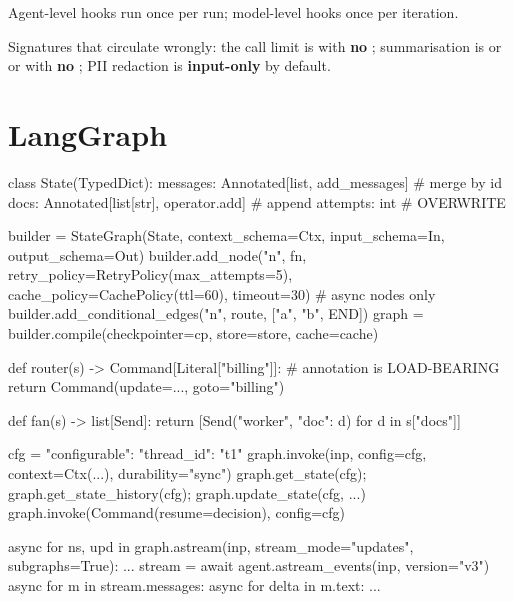 Agent-level hooks run once per run; model-level hooks once per iteration.

\begin{warning}
Signatures that circulate wrongly: the call limit is
 with \textbf{no}
; summarisation is  or
 or  with \textbf{no}
; PII redaction is \textbf{input-only} by
default.
\end{warning}

\section{LangGraph}
\label{sec:appB-langgraph}

\begin{python}[caption={State, graph, persistence}, label={lst:appB-lg}]
class State(TypedDict):
    messages: Annotated[list, add_messages]         # merge by id
    docs: Annotated[list[str], operator.add]        # append
    attempts: int                                    # OVERWRITE

builder = StateGraph(State, context_schema=Ctx,
                     input_schema=In, output_schema=Out)
builder.add_node("n", fn, retry_policy=RetryPolicy(max_attempts=5),
                 cache_policy=CachePolicy(ttl=60), timeout=30)  # async nodes only
builder.add_conditional_edges("n", route, ["a", "b", END])
graph = builder.compile(checkpointer=cp, store=store, cache=cache)

def router(s) -> Command[Literal["billing"]]:        # annotation is LOAD-BEARING
    return Command(update={...}, goto="billing")

def fan(s) -> list[Send]:
    return [Send("worker", {"doc": d}) for d in s["docs"]]

cfg = {"configurable": {"thread_id": "t1"}}
graph.invoke(inp, config=cfg, context=Ctx(...), durability="sync")
graph.get_state(cfg); graph.get_state_history(cfg); graph.update_state(cfg, {...})
graph.invoke(Command(resume=decision), config=cfg)

async for ns, upd in graph.astream(inp, stream_mode="updates", subgraphs=True): ...
stream = await agent.astream_events(inp, version="v3")
async for m in stream.messages:
    async for delta in m.text: ...
\end{python}

